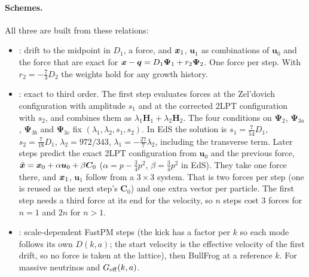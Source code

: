 \paragraph*{Schemes.} All three are built from these relations:
\begin{itemize}
\item {}: drift to the midpoint in $D_1$, a force, and $\bm{x}_1$, $\bm u_1$ as combinations of $\bm u_0$ and the
      force that are exact for $\bm{x}-\bm{q} = D_1\bm\Psi_1 + r_2\bm\Psi_2$. One force per step. With $r_2 = -\tfrac73 D_2$
      the weights hold for any growth history.
\item {}: exact to third order. The first step evaluates forces at the Zel'dovich configuration with
      amplitude $s_1$ and at the corrected 2LPT configuration with $s_2$, and combines them as
      $\lambda_1\bm H_1+\lambda_2\bm H_2$. The four conditions on $\bm\Psi_2$, $\bm\Psi_{3a}$, $\bm\Psi_{3b}$ and
      $\bm\Psi_{3c}$ fix $(\lambda_1,\lambda_2,s_1,s_2)$. In EdS the solution is $s_1 = \tfrac{7}{54}D_1$,
      $s_2=\tfrac{7}{18}D_1$, $\lambda_2 = 972/343$, $\lambda_1 = -\tfrac{27}{7}\lambda_2$, including the transverse term.
      Later steps predict the exact 2LPT configuration from $\bm u_0$ and the previous force,
      $\tilde{\bm{x}} = \bm{x}_0 + \alpha\bm u_0 + \beta\bm C_0$ ($\alpha = p-\tfrac34p^2$, $\beta=\tfrac34p^2$ in EdS). They take
      one force there, and $\bm{x}_1$, $\bm u_1$ follow from a $3\times3$ system. That is two forces per step (one is reused
      as the next step's $\bm C_0$) and one extra vector per particle. The first step needs a third force at its end
      for the velocity, so $n$ steps cost 3 forces for $n=1$ and $2n$ for $n>1$.
\item {}: scale-dependent FastPM steps (the kick has a factor per $k$ so each mode follows its own
      $D(k,a)$; the start velocity is the effective velocity of the first drift, so no force is taken at the lattice),
      then BullFrog at a reference $k$. For massive neutrinos and $G_{\rm eff}(k,a)$.
\end{itemize}

